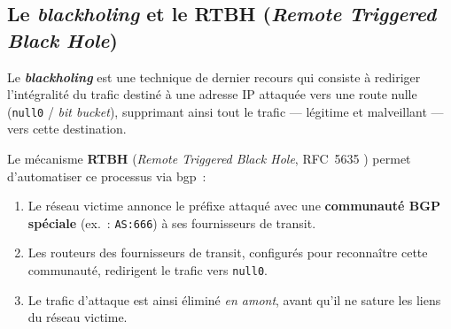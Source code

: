 \subsection{Le \textit{blackholing} et le RTBH (\textit{Remote Triggered Black Hole})}

Le \textbf{\textit{blackholing}} est une technique de dernier recours qui consiste à rediriger l'intégralité du trafic destiné à une adresse IP attaquée vers une route nulle (\texttt{null0} / \textit{bit bucket}), supprimant ainsi tout le trafic --- légitime et malveillant --- vers cette destination.

Le mécanisme \textbf{RTBH} (\textit{Remote Triggered Black Hole}, RFC~5635 \parencite{kumari2009rtbh}) permet d'automatiser ce processus via \gls{bgp}~:
\begin{enumerate}
    \item Le réseau victime annonce le préfixe attaqué avec une \textbf{communauté BGP spéciale} (ex.~: \texttt{AS:666}) à ses fournisseurs de transit.
    \item Les routeurs des fournisseurs de transit, configurés pour reconnaître cette communauté, redirigent le trafic vers \texttt{null0}.
    \item Le trafic d'attaque est ainsi éliminé \textit{en amont}, avant qu'il ne sature les liens du réseau victime.
\end{enumerate}

